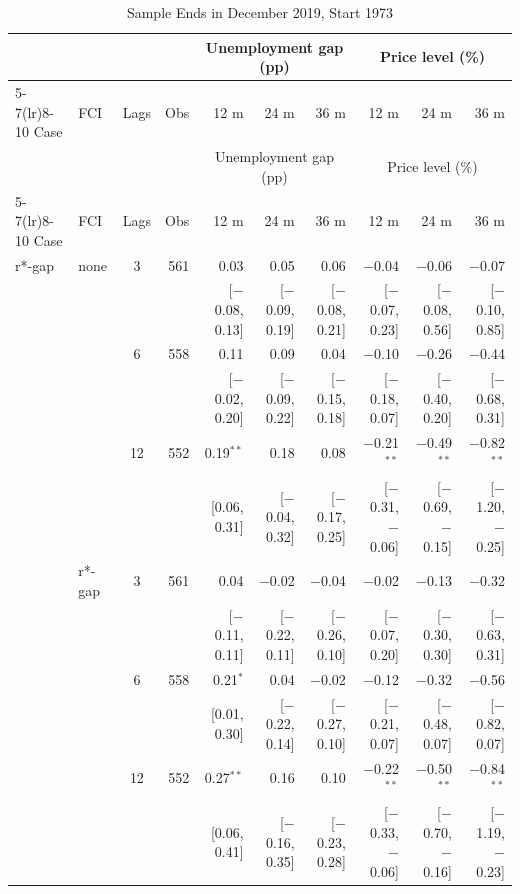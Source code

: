 \begingroup\scriptsize\setlength{\tabcolsep}{0.9pt}
\begin{longtable}{llcrrrrrrr}
\caption{Sample Ends in December 2019, Start 1973}\label{tab:appR1c73}\\
\toprule
 & & & & \multicolumn{3}{c}{Unemployment gap (pp)} & \multicolumn{3}{c}{Price level (\%)}\\ \cmidrule(lr){5-7}\cmidrule(lr){8-10}
Case & FCI & Lags & Obs & 12 m & 24 m & 36 m & 12 m & 24 m & 36 m\\
\midrule\endfirsthead
\toprule
 & & & & \multicolumn{3}{c}{Unemployment gap (pp)} & \multicolumn{3}{c}{Price level (\%)}\\ \cmidrule(lr){5-7}\cmidrule(lr){8-10}
Case & FCI & Lags & Obs & 12 m & 24 m & 36 m & 12 m & 24 m & 36 m\\
\midrule\endhead
\bottomrule\endfoot
r*-gap & none & 3 & 561 & 0.03 & 0.05 & 0.06 & $-$0.04 & $-$0.06 & $-$0.07\\
 & & & & {\scriptsize [$-$0.08, 0.13]} & {\scriptsize [$-$0.09, 0.19]} & {\scriptsize [$-$0.08, 0.21]} & {\scriptsize [$-$0.07, 0.23]} & {\scriptsize [$-$0.08, 0.56]} & {\scriptsize [$-$0.10, 0.85]}\\
 &  & 6 & 558 & 0.11 & 0.09 & 0.04 & $-$0.10 & $-$0.26 & $-$0.44\\
 & & & & {\scriptsize [$-$0.02, 0.20]} & {\scriptsize [$-$0.09, 0.22]} & {\scriptsize [$-$0.15, 0.18]} & {\scriptsize [$-$0.18, 0.07]} & {\scriptsize [$-$0.40, 0.20]} & {\scriptsize [$-$0.68, 0.31]}\\
 &  & 12 & 552 & 0.19$^{**}$ & 0.18 & 0.08 & $-$0.21$^{**}$ & $-$0.49$^{**}$ & $-$0.82$^{**}$\\
 & & & & {\scriptsize [0.06, 0.31]} & {\scriptsize [$-$0.04, 0.32]} & {\scriptsize [$-$0.17, 0.25]} & {\scriptsize [$-$0.31, $-$0.06]} & {\scriptsize [$-$0.69, $-$0.15]} & {\scriptsize [$-$1.20, $-$0.25]}\\
 & r*-gap & 3 & 561 & 0.04 & $-$0.02 & $-$0.04 & $-$0.02 & $-$0.13 & $-$0.32\\
 & & & & {\scriptsize [$-$0.11, 0.11]} & {\scriptsize [$-$0.22, 0.11]} & {\scriptsize [$-$0.26, 0.10]} & {\scriptsize [$-$0.07, 0.20]} & {\scriptsize [$-$0.30, 0.30]} & {\scriptsize [$-$0.63, 0.31]}\\
 &  & 6 & 558 & 0.21$^{*}$ & 0.04 & $-$0.02 & $-$0.12 & $-$0.32 & $-$0.56\\
 & & & & {\scriptsize [0.01, 0.30]} & {\scriptsize [$-$0.22, 0.14]} & {\scriptsize [$-$0.27, 0.10]} & {\scriptsize [$-$0.21, 0.07]} & {\scriptsize [$-$0.48, 0.07]} & {\scriptsize [$-$0.82, 0.07]}\\
 &  & 12 & 552 & 0.27$^{**}$ & 0.16 & 0.10 & $-$0.22$^{**}$ & $-$0.50$^{**}$ & $-$0.84$^{**}$\\
 & & & & {\scriptsize [0.06, 0.41]} & {\scriptsize [$-$0.16, 0.35]} & {\scriptsize [$-$0.23, 0.28]} & {\scriptsize [$-$0.33, $-$0.06]} & {\scriptsize [$-$0.70, $-$0.16]} & {\scriptsize [$-$1.19, $-$0.23]}\\
\end{longtable}
